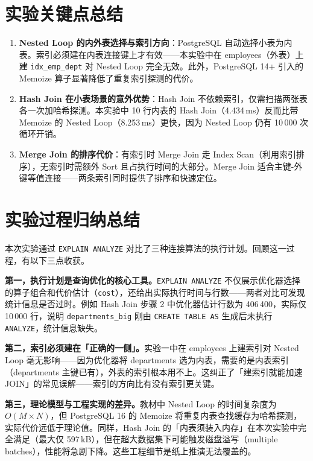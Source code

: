 \documentclass[12pt, a4paper]{academics}
\begin{document}
\section{实验关键点总结}

\begin{enumerate}
    \item \textbf{Nested Loop 的内外表选择与索引方向}：PostgreSQL 自动选择小表为内表。索引必须建在内表连接键上才有效——本实验中在 employees（外表）上建 \texttt{idx\_emp\_dept} 对 Nested Loop 完全无效。此外，PostgreSQL 14+ 引入的 Memoize 算子显著降低了重复索引探测的代价。
    \item \textbf{Hash Join 在小表场景的意外优势}：Hash Join 不依赖索引，仅需扫描两张表各一次加哈希探测。本实验中 10 行内表的 Hash Join（4.434\,ms）反而比带 Memoize 的 Nested Loop（8.253\,ms）更快，因为 Nested Loop 仍有 10\,000 次循环开销。
    \item \textbf{Merge Join 的排序代价}：有索引时 Merge Join 走 Index Scan（利用索引排序），无索引时需额外 Sort 且占执行时间的大部分。Merge Join 适合主键-外键等值连接——两条索引同时提供了排序和快速定位。
\end{enumerate}

\section{实验过程归纳总结}

本次实验通过 \texttt{EXPLAIN ANALYZE} 对比了三种连接算法的执行计划。回顾这一过程，有以下三点收获。

\textbf{第一，执行计划是查询优化的核心工具。}\texttt{EXPLAIN ANALYZE} 不仅展示优化器选择的算子组合和代价估计（\texttt{cost}），还给出实际执行时间与行数——两者对比可发现统计信息是否过时。例如 Hash Join 步骤 2 中优化器估计行数为 406\,400，实际仅 10\,000 行，说明 \texttt{departments\_big} 刚由 \texttt{CREATE TABLE AS} 生成后未执行 \texttt{ANALYZE}，统计信息缺失。

\textbf{第二，索引必须建在「正确的一侧」。}实验一中在 employees 上建索引对 Nested Loop 毫无影响——因为优化器将 departments 选为内表，需要的是内表索引（departments 主键已有），外表的索引根本用不上。这纠正了「建索引就能加速 JOIN」的常见误解——索引的方向比有没有索引更关键。

\textbf{第三，理论模型与工程实现的差异。}教材中 Nested Loop 的时间复杂度为 $O(M \times N)$，但 PostgreSQL 16 的 Memoize 将重复内表查找缓存为哈希探测，实际代价远低于理论值。同样，Hash Join 的「内表须装入内存」在本次实验中完全满足（最大仅 597\,kB），但在超大数据集下可能触发磁盘溢写（multiple batches），性能将急剧下降。这些工程细节是纸上推演无法覆盖的。
\end{document}
